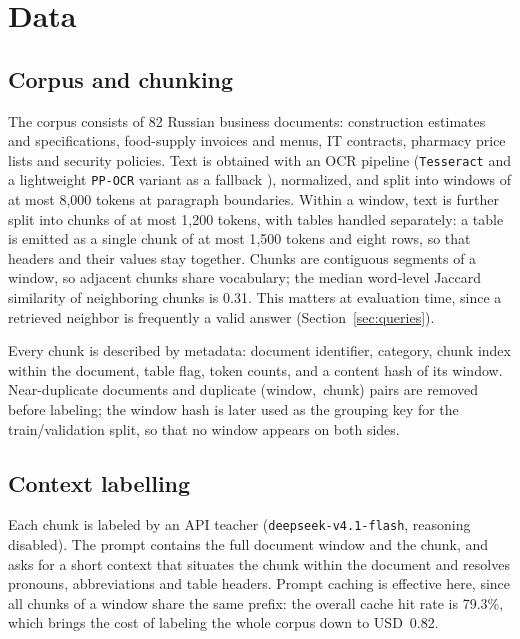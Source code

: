 \section{Data}
\label{sec:data}

\subsection{Corpus and chunking}

The corpus consists of 82 Russian business documents: construction estimates
and specifications, food-supply invoices and menus, IT contracts, pharmacy
price lists and security policies. Text is obtained with an OCR pipeline
(\texttt{Tesseract} and a lightweight \texttt{PP-OCR} variant as a fallback
\citep{smith2007tesseract,du2020ppocr}), normalized, and split into windows of
at most 8{,}000 tokens at paragraph boundaries. Within a window, text is
further split into chunks of at most 1{,}200 tokens, with tables handled
separately: a table is emitted as a single chunk of at most 1{,}500 tokens and
eight rows, so that headers and their values stay together. Chunks are
contiguous segments of a window, so adjacent chunks share vocabulary; the
median word-level Jaccard similarity of neighboring chunks is 0.31. This
matters at evaluation time, since a retrieved neighbor is frequently a valid
answer (Section~\ref{sec:queries}).

Every chunk is described by metadata: document identifier, category, chunk
index within the document, table flag, token counts, and a content hash of its
window. Near-duplicate documents and duplicate
(window,~chunk) pairs are removed before labeling; the window hash is later
used as the grouping key for the train/validation split, so that no window
appears on both sides.

\subsection{Context labelling}

Each chunk is labeled by an API teacher
(\texttt{deepseek-v4.1-flash}, reasoning disabled). The prompt contains the
full document window and the chunk, and asks for a short context that situates
the chunk within the document and resolves pronouns, abbreviations and table
headers. Prompt caching is effective here, since all chunks of a window share the
same prefix: the overall cache hit rate is 79.3\%, which brings the cost of
labeling the whole corpus down to USD~0.82.


